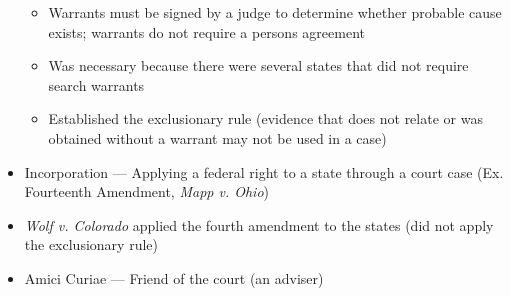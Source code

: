\documentclass[12pt]{article}
\begin{document}
\begin{itemize}
\begin{itemize}
      \item Warrants must be signed by a judge to determine whether probable cause exists; warrants do not require a persons agreement

      \item Was necessary because there were several states that did not require search warrants

      \item Established the exclusionary rule (evidence that does not relate or was obtained without a warrant may not be used in a case)

    \end{itemize}

  \item Incorporation — Applying a federal right to a state through a court case (Ex. Fourteenth Amendment, \textit{Mapp v. Ohio})

  \item \textit{Wolf v. Colorado} applied the fourth amendment to the states (did not apply the exclusionary rule)

  \item Amici Curiae — Friend of the court (an adviser)

\end{itemize}
\end{document}
